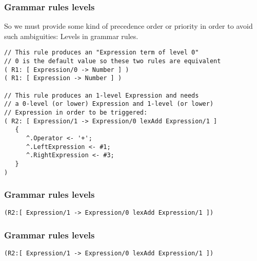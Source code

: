 \documentclass[11pt]{beamer}
\begin{document}
\begin{frame}[fragile]
\frametitle{Grammar rules levels}
So we must provide some kind of precedence order or priority in order to avoid such ambiguities: Levels in grammar rules.
\scriptsize
\begin{lstlisting}[language=lekta]
// This rule produces an "Expression term of level 0"
// 0 is the default value so these two rules are equivalent
( R1: [ Expression/0 -> Number ] )
( R1: [ Expression -> Number ] )

// This rule produces an 1-level Expression and needs
// a 0-level (or lower) Expression and 1-level (or lower)
// Expression in order to be triggered:
( R2: [ Expression/1 -> Expression/0 lexAdd Expression/1 ]
   { 
      ^.Operator <- '+';
      ^.LeftExpression <- #1;
      ^.RightExpression <- #3; 
   }
)
\end{lstlisting}
\end{frame}

\begin{frame}
\frametitle{Grammar rules levels}
\small
\begin{center}
\texttt{(R2:[ Expression/1 -> Expression/0 lexAdd Expression/1 ])}
\end{center}
\begin{center}
	\large
\end{center}
\end{frame}

\begin{frame}[noframenumbering]
\frametitle{Grammar rules levels}
\small
\begin{center}
\texttt{(R2:[ Expression/1 -> Expression/0 lexAdd Expression/1 ])}
\end{center}
\begin{center}
	\large
\end{center}
\end{frame}
\end{document}
